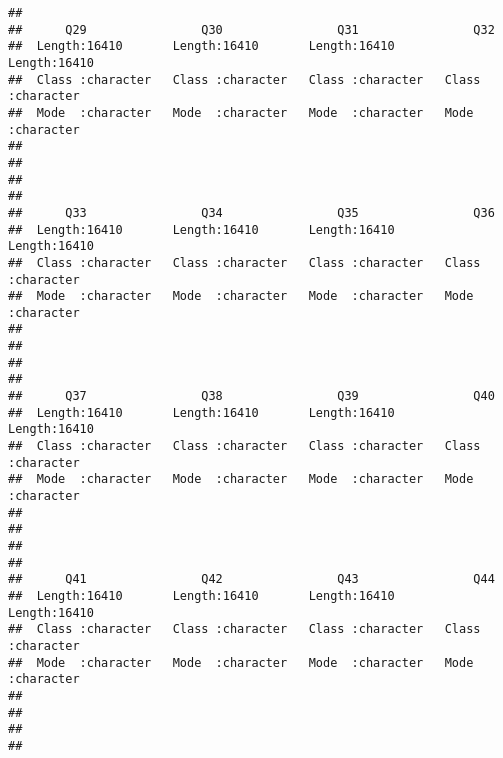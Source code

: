 \documentclass[
]{article}
\begin{document}
\begin{verbatim}
##                                                                             
##      Q29                Q30                Q31                Q32           
##  Length:16410       Length:16410       Length:16410       Length:16410      
##  Class :character   Class :character   Class :character   Class :character  
##  Mode  :character   Mode  :character   Mode  :character   Mode  :character  
##                                                                             
##                                                                             
##                                                                             
##                                                                             
##      Q33                Q34                Q35                Q36           
##  Length:16410       Length:16410       Length:16410       Length:16410      
##  Class :character   Class :character   Class :character   Class :character  
##  Mode  :character   Mode  :character   Mode  :character   Mode  :character  
##                                                                             
##                                                                             
##                                                                             
##                                                                             
##      Q37                Q38                Q39                Q40           
##  Length:16410       Length:16410       Length:16410       Length:16410      
##  Class :character   Class :character   Class :character   Class :character  
##  Mode  :character   Mode  :character   Mode  :character   Mode  :character  
##                                                                             
##                                                                             
##                                                                             
##                                                                             
##      Q41                Q42                Q43                Q44           
##  Length:16410       Length:16410       Length:16410       Length:16410      
##  Class :character   Class :character   Class :character   Class :character  
##  Mode  :character   Mode  :character   Mode  :character   Mode  :character  
##                                                                             
##                                                                             
##                                                                             
##                                                                             

\end{verbatim}
\end{document}
